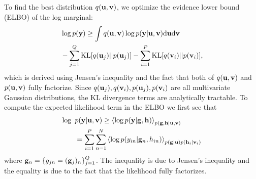 \noindent
To find the best distribution $q(\mathbf{u}, \mathbf{v})$, we  optimize the evidence lower bound (ELBO) of the log marginal:
\begin{align}
\nonumber
&\log p(\mathbf{y}) \ge \int q(\mathbf{u}, \mathbf{v}) \log p(\mathbf{y} | \mathbf{u}, \mathbf{v})  \mathrm{d} \mathbf{u} \mathrm{d} \mathbf{v} \\
&- \sum_{j=1}^Q \text{KL}[q(\mathbf{u}_j) || p(\mathbf{u}_j)] - \sum_{i=1}^P \text{KL}[q(\mathbf{v}_i) || p(\mathbf{v}_i)],
\label{eq:elbo}
\end{align}
which is derived using Jensen's inequality and the fact that both of $q(\mathbf{u}, \mathbf{v})$ and $p(\mathbf{u}, \mathbf{v})$ fully factorize.
Since $q(\mathbf{u}_j), q(\mathbf{v}_i), p(\mathbf{u}_j), p(\mathbf{v}_i)$ are all multivariate Gaussian distributions, the KL divergence terms are analytically tractable. To compute the expected likelihood term in the ELBO we first see that
\begin{align}
\nonumber
\log \text{ } &p(\mathbf{y} | \mathbf{u}, \mathbf{v})
\ge \left\langle \log p(\mathbf{y} | \mathbf{g}, \mathbf{h}) \right\rangle_{p(\mathbf{g},\mathbf{h} | \mathbf{u}, \mathbf{v})}  \\
&= \sum_{i=1}^P \sum_{n=1}^N \left\langle \log p(y_{in} | \mathbf{g}_n, h_{in})  \right\rangle_{p(\mathbf{g} | \mathbf{u}) p(\mathbf{h}_i | \mathbf{v}_i)} 
\end{align}
where $\mathbf{g}_n = \{g_{jn} = (\mathbf{g}_j)_n\}_{j=1}^Q$.
The inequality is due to Jensen's inequality and the equality is due to the fact that the likelihood fully factorizes.
\newcommand{\Ahi}{\A^h_i}
\newcommand{\Zi}{\Z_i}

